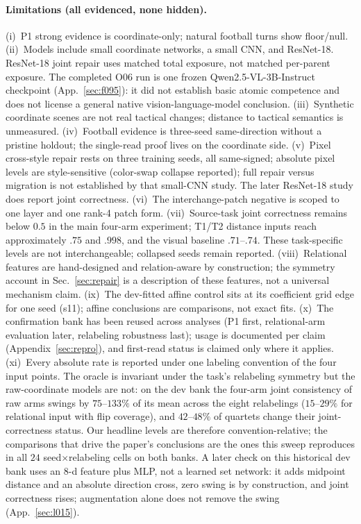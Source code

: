 \paragraph{Limitations (all evidenced, none hidden).}
(i)~P1 strong evidence is coordinate-only; natural football turns show
floor/null.
(ii)~Models include small coordinate networks, a small CNN, and ResNet-18.
ResNet-18 joint repair uses matched total exposure, not matched per-parent
exposure. The completed O06 run is one frozen Qwen2.5-VL-3B-Instruct
checkpoint (App.~\ref{sec:f095}): it did not establish basic atomic
competence and does not license a general native vision-language-model
conclusion.
(iii)~Synthetic coordinate scenes are not real tactical changes; distance
to tactical semantics is unmeasured.
(iv)~Football evidence is three-seed same-direction without a pristine
holdout; the single-read proof lives on the coordinate side.
(v)~Pixel cross-style repair rests on three training seeds, all
same-signed; absolute pixel levels are style-sensitive (color-swap
collapse reported); full repair versus migration is not established by that small-CNN study.
The later ResNet-18 study does report joint correctness.
(vi)~The interchange-patch negative is scoped to one layer and one rank-4
patch form.
(vii)~Source-task joint correctness remains below $0.5$ in the main
four-arm experiment; T1/T2 distance inputs reach approximately $.75$ and
$.998$, and the visual baseline $.71$--$.74$. These task-specific levels
are not interchangeable; collapsed seeds remain reported.
(viii)~Relational features are hand-designed and relation-aware by
construction; the symmetry account in Sec.~\ref{sec:repair} is a
description of these features, not a universal mechanism claim.
(ix)~The dev-fitted affine control sits at its coefficient grid edge for
one seed (s11); affine conclusions are comparisons, not exact fits.
(x)~The confirmation bank has been reused across analyses (P1 first,
relational-arm evaluation later, relabeling robustness last); usage is
documented per claim (Appendix~\ref{sec:repro}), and first-read status is
claimed only where it applies.
(xi)~Every absolute rate is reported under one labeling convention of the
four input points. The oracle is invariant under the task's relabeling
symmetry but the raw-coordinate models are not: on the dev bank the
four-arm joint consistency of raw arms swings by $75$--$133\%$ of its mean
across the eight relabelings ($15$--$29\%$ for relational input with flip
coverage), and $42$--$48\%$ of quartets change their joint-correctness
status. Our headline levels are therefore convention-relative; the
comparisons that drive the paper's conclusions are the ones this sweep
reproduces in all $24$ seed$\times$relabeling cells on both banks.
A later check on this historical dev bank uses an 8-d feature plus MLP,
not a learned set network: it adds midpoint distance and an absolute
direction cross, zero swing is by construction, and joint correctness
rises; augmentation alone does not remove the swing
(App.~\ref{sec:l015}).

